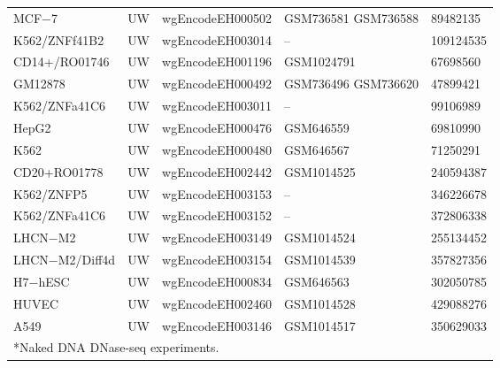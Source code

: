 \documentclass[11pt]{article}
\begin{document}
\begin{longtable}{p{3.5cm}p{1cm}p{4cm}p{2.8cm}p{3cm}}
MCF−7 & UW & wgEncodeEH000502 & GSM736581 \newline GSM736588 & 89482135 \\
K562/ZNFf41B2 & UW & wgEncodeEH003014 & -- & 109124535 \\
CD14+/RO01746 & UW & wgEncodeEH001196 & GSM1024791 & 67698560 \\
GM12878 & UW & wgEncodeEH000492 & GSM736496 \newline GSM736620 & 47899421 \\
K562/ZNFa41C6 & UW & wgEncodeEH003011 & -- & 99106989 \\
HepG2 & UW & wgEncodeEH000476 & GSM646559 & 69810990 \\
K562 & UW & wgEncodeEH000480 & GSM646567 & 71250291 \\
CD20+RO01778 & UW & wgEncodeEH002442 & GSM1014525 & 240594387 \\
K562/ZNFP5 & UW & wgEncodeEH003153 & -- & 346226678 \\
K562/ZNFa41C6 & UW & wgEncodeEH003152 & -- & 372806338 \\
LHCN−M2 & UW & wgEncodeEH003149 & GSM1014524 & 255134452 \\
LHCN−M2/Diff4d & UW & wgEncodeEH003154 & GSM1014539 & 357827356 \\
H7−hESC & UW & wgEncodeEH000834 & GSM646563 & 302050785 \\
HUVEC & UW & wgEncodeEH002460 & GSM1014528 & 429088276 \\
A549 & UW & wgEncodeEH003146 & GSM1014517 & 350629033 \\
\hline
\multicolumn{5}{l}{*Naked DNA DNase-seq experiments.} \\
\end{longtable}

\clearpage
\end{document}
